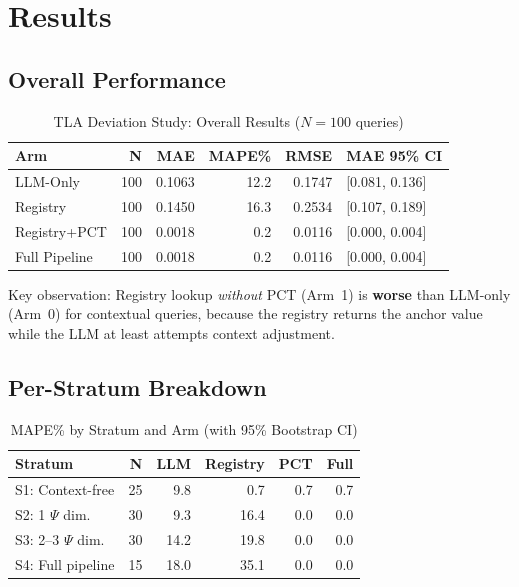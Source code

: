 
\section{Results}
\label{sec:lb-results}

\subsection{Overall Performance}

\begin{table}[htbp]
\centering
\caption{TLA Deviation Study: Overall Results ($N = 100$ queries)}
\label{tab:tla-overall}
\begin{tabular}{lrrrrl}
\toprule
\textbf{Arm} & \textbf{N} & \textbf{MAE} & \textbf{MAPE\%} & \textbf{RMSE} & \textbf{MAE 95\% CI} \\
\midrule
LLM-Only       & 100 & 0.1063 & 12.2 & 0.1747 & [0.081, 0.136] \\
Registry       & 100 & 0.1450 & 16.3 & 0.2534 & [0.107, 0.189] \\
Registry+PCT   & 100 & 0.0018 &  0.2 & 0.0116 & [0.000, 0.004] \\
Full Pipeline  & 100 & 0.0018 &  0.2 & 0.0116 & [0.000, 0.004] \\
\bottomrule
\end{tabular}
\end{table}

Key observation: Registry lookup \emph{without} PCT (Arm~1) is \textbf{worse}
than LLM-only (Arm~0) for contextual queries, because the registry returns
the anchor value while the LLM at least attempts context adjustment.

\subsection{Per-Stratum Breakdown}

\begin{table}[htbp]
\centering
\caption{MAPE\% by Stratum and Arm (with 95\% Bootstrap CI)}
\label{tab:tla-stratum}
\begin{tabular}{lrrrrr}
\toprule
\textbf{Stratum} & \textbf{N} &
  \textbf{LLM} & \textbf{Registry} & \textbf{PCT} & \textbf{Full} \\
\midrule
S1: Context-free          & 25 &  9.8 &  0.7 & 0.7 & 0.7 \\
S2: 1 $\Psi$ dim.        & 30 &  9.3 & 16.4 & 0.0 & 0.0 \\
S3: 2--3 $\Psi$ dim.     & 30 & 14.2 & 19.8 & 0.0 & 0.0 \\
S4: Full pipeline         & 15 & 18.0 & 35.1 & 0.0 & 0.0 \\
\bottomrule
\end{tabular}
\end{table}

